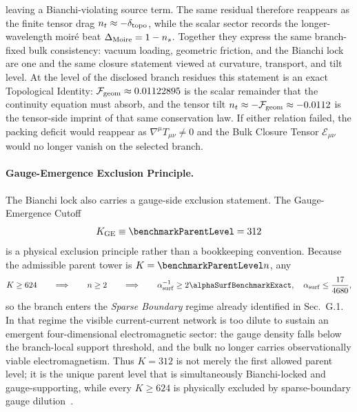 \documentclass[11pt]{article}
\begin{document}
leaving a Bianchi-violating source term. The same residual therefore reappears as the finite tensor drag $n_t\approx-\delta_{\rm topo}$,
while the scalar sector records the longer-wavelength moir\'e beat
$\Delta_{\rm Moire}=1-n_s$. Together they express the same branch-fixed bulk
consistency: vacuum loading, geometric friction, and the Bianchi lock are one
and the same closure statement viewed at curvature, transport, and tilt level.
At the level of the disclosed branch residues this statement is an exact
Topological Identity: $\mathcal F_{\rm geom}\approx0.01122895$ is the scalar remainder
that the continuity equation must absorb, and the tensor tilt
$n_t\approx-\mathcal F_{\rm geom}\approx-0.0112$ is the tensor-side imprint of
that same conservation law. If either relation failed, the packing deficit
would reappear as $\nabla^{\mu}T_{\mu\nu}\neq0$ and the Bulk Closure Tensor
$\mathcal E_{\mu\nu}$ would no longer vanish on the selected branch.

\paragraph{Gauge-Emergence Exclusion Principle.}
The Bianchi lock also carries a gauge-side exclusion statement. The
Gauge-Emergence Cutoff
\begin{equation}
\label{eq:gravity-gauge-emergence-cutoff-local}
 K_{\rm GE}\equiv\benchmarkParentLevel=312
\end{equation}
is a physical exclusion principle rather than a bookkeeping convention. Because
the admissible parent tower is $K=\benchmarkParentLevel n$, any
\begin{equation}
\label{eq:gravity-sparse-boundary-cutoff-local}
 K\ge624
 \qquad\Longrightarrow\qquad
 n\ge2
 \qquad\Longrightarrow\qquad
 \alpha^{-1}_{\rm surf}\ge 2\alphaSurfBenchmarkExact,
 \quad
 \alpha_{\rm surf}\le\frac{17}{4680},
\end{equation}
so the branch enters the \emph{Sparse Boundary} regime already identified in
Sec.~G.1. In that regime the visible current-current network is too dilute to
sustain an emergent four-dimensional electromagnetic sector: the gauge density
falls below the branch-local support threshold, and the bulk no longer carries
observationally viable electromagnetism. Thus $K=312$ is not merely the first
allowed parent level; it is the unique parent level that is simultaneously
Bianchi-locked and gauge-supporting, while every $K\ge624$ is physically
excluded by sparse-boundary gauge dilution~\cite{friedan1987,witten1989,gko1985}.
\end{document}
